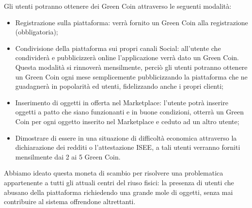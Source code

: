 Gli utenti potranno ottenere dei Green Coin attraverso le seguenti modalità:
\begin{itemize}
    \item 
    Registrazione sulla piattaforma: verrà fornito un Green Coin alla registrazione (obbligatoria);
    \item Condivisione della piattaforma sui propri canali Social: all’utente che condividerà e pubblicizzerà online l’applicazione verrà dato un Green Coin. Questa modalità si rinnoverà mensilmente, perciò gli utenti potranno ottenere un Green Coin ogni mese semplicemente pubblicizzando la piattaforma che ne guadagnerà in popolarità ed utenti, fidelizzando anche i propri clienti; 
    \item Inserimento di oggetti in offerta nel Marketplace: l’utente potrà inserire oggetti a patto che siano funzionanti e in buone condizioni, otterrà un Green Coin per ogni oggetto inserito nel Marketplace e ceduto ad un altro utente;
    \item Dimostrare di essere in una situazione di difficoltà economica attraverso la dichiarazione dei redditi o l’attestazione ISEE, a tali utenti verranno forniti mensilmente dai 2 ai 5 Green Coin.
\end{itemize}
Abbiamo ideato questa moneta di scambio per risolvere una problematica appartenente a tutti gli attuali centri del riuso fisici: la presenza di utenti che abusano della piattaforma richiedendo una grande mole di oggetti, senza mai contribuire al sistema offrendone altrettanti. 
\medskip

